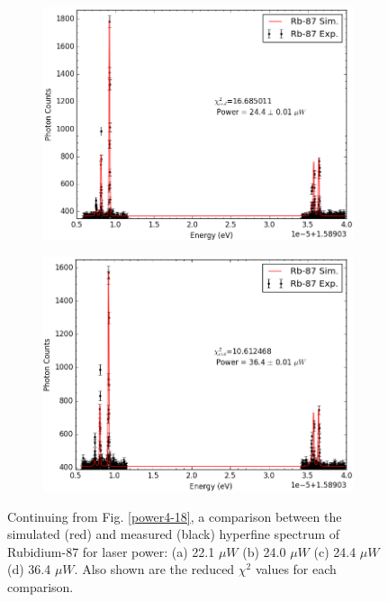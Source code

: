 \begin{figure}[t!]
    \begin{subfigure}[b]{0.49\textwidth}
        \includegraphics[width=\textwidth]{Graphics/121_122.png}
        \caption{}
    \end{subfigure}
    \begin{subfigure}[b]{0.49\textwidth}
        \includegraphics[width=\textwidth]{Graphics/111_112.png}
        \caption{}
        \label{}
    \end{subfigure}
    \caption[Continuation of Fig. \ref{power4-18}.]{\small Continuing from Fig. \ref{power4-18}, a comparison between the simulated (red) and measured (black) hyperfine spectrum of Rubidium-87 for laser power: (a) 22.1 $\mu W$ (b) 24.0 $\mu W$ (c) 24.4 $\mu W$ (d) 36.4 $\mu W$. Also shown are the reduced $\chi^2$ values for each comparison.}
\label{power22-36}
\end{figure}
